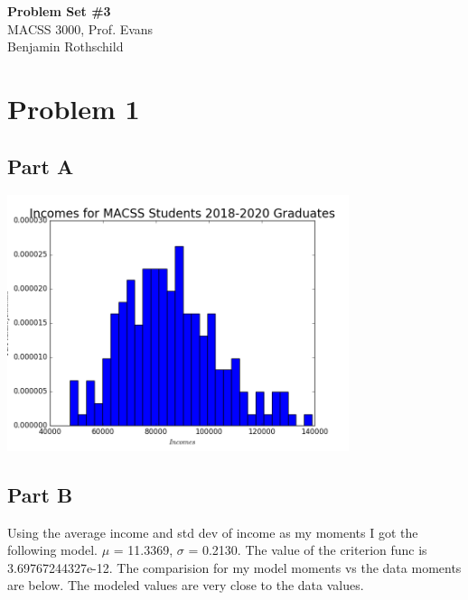 \documentclass{article}
\begin{document}
\begin{flushleft}
    \textbf{\large{Problem Set \#3}} \\
    MACSS 3000, Prof. Evans \\
    Benjamin Rothschild
\end{flushleft}

\section*{Problem 1}
\subsection*{Part A}
\begin{center}\includegraphics[width=100mm]{images/1a.png}\end{center}

\subsection*{Part B}
Using the average income and std dev of income as my moments I got the following model.  $\mu$ = 11.3369, $\sigma$ = 0.2130.  The value of the criterion func is 3.69767244327e-12.  The comparision for my model moments vs the data moments are below.  The modeled values are very close to the data values.
\end{document}
